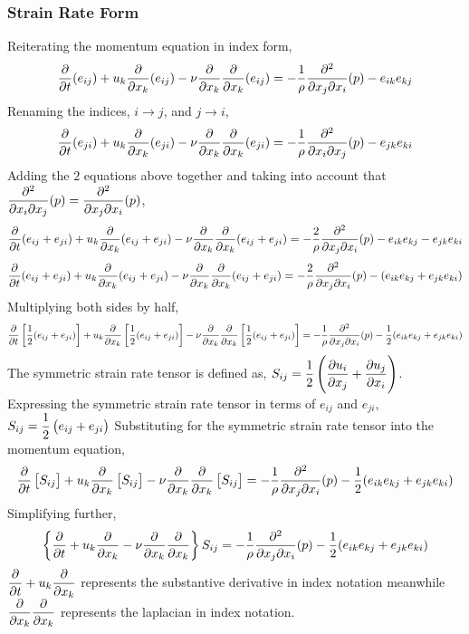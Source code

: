\documentclass[class=report, 12pt, crop=false]{standalone}
\begin{document}
\begin{center}
\subsubsection{Strain Rate Form}
\begin{comment}
\end{comment}
Reiterating the momentum equation in index form,
$$\frac{\partial}{\partial t}(e_{ij}) + u_k\frac{\partial }{\partial x_k}(e_{ij}) - \nu\frac{\partial}{\partial x_k}\frac{\partial}{\partial x_k}(e_{ij}) = -\frac{1}{\rho}\frac{\partial^2}{\partial x_j\partial x_i}(p) - e_{ik}e_{kj}$$
Renaming the indices, $i\to j$, and $j\to i$,
$$\frac{\partial}{\partial t}(e_{ji}) + u_k\frac{\partial }{\partial x_k}(e_{ji}) - \nu\frac{\partial}{\partial x_k}\frac{\partial}{\partial x_k}(e_{ji}) = -\frac{1}{\rho}\frac{\partial^2}{\partial x_i\partial x_j}(p) - e_{jk}e_{ki}$$
Adding the $2$ equations above together and taking into account that $\displaystyle{\frac{\partial^2}{\partial x_i\partial x_j}(p)=\frac{\partial^2}{\partial x_j\partial x_i}(p)}$,
$$\frac{\partial}{\partial t}(e_{ij} + e_{ji}) + u_k\frac{\partial }{\partial x_k}(e_{ij} + e_{ji}) - \nu\frac{\partial}{\partial x_k}\frac{\partial}{\partial x_k}(e_{ij} + e_{ji}) = -\frac{2}{\rho}\frac{\partial^2}{\partial x_j\partial x_i}(p) - e_{ik}e_{kj} - e_{jk}e_{ki}$$
$$\frac{\partial}{\partial t}(e_{ij} + e_{ji}) + u_k\frac{\partial }{\partial x_k}(e_{ij} + e_{ji}) - \nu\frac{\partial}{\partial x_k}\frac{\partial}{\partial x_k}(e_{ij} + e_{ji}) = -\frac{2}{\rho}\frac{\partial^2}{\partial x_j\partial x_i}(p) - (e_{ik}e_{kj} + e_{jk}e_{ki})$$
Multiplying both sides by half,
$$\frac{\partial}{\partial t}\left[\frac{1}{2}(e_{ij}+e_{ji})\right] + u_k\frac{\partial }{\partial x_k}\left[\frac{1}{2}(e_{ij}+e_{ji})\right] - \nu\frac{\partial}{\partial x_k}\frac{\partial}{\partial x_k}\left[\frac{1}{2}(e_{ij}+e_{ji})\right] = -\frac{1}{\rho}\frac{\partial^2}{\partial x_j\partial x_i}(p) - \frac{1}{2}(e_{ik}e_{kj}+e_{jk}e_{ki})$$
The symmetric strain rate tensor is defined as, $\displaystyle{S_{ij} = \frac{1}{2}\left(\frac{\partial u_i}{\partial x_j}+\frac{\partial u_j}{\partial x_i}\right)}$. Expressing the symmetric strain rate tensor in terms of $e_{ij}$ and $e_{ji}$, $\displaystyle{S_{ij} = \frac{1}{2}\left(e_{ij}+e_{ji}\right)}$
Substituting for the symmetric strain rate tensor into the momentum equation,
$$\frac{\partial}{\partial t}\left[S_{ij}\right] + u_k\frac{\partial }{\partial x_k}\left[S_{ij}\right] - \nu\frac{\partial}{\partial x_k}\frac{\partial}{\partial x_k}\left[S_{ij}\right] = -\frac{1}{\rho}\frac{\partial^2}{\partial x_j\partial x_i}(p) - \frac{1}{2}(e_{ik}e_{kj}+e_{jk}e_{ki})$$
Simplifying further,
$$\left\{\frac{\partial}{\partial t} + u_k\frac{\partial }{\partial x_k} - \nu\frac{\partial}{\partial x_k}\frac{\partial}{\partial x_k}\right\}S_{ij} = -\frac{1}{\rho}\frac{\partial^2}{\partial x_j\partial x_i}(p) - \frac{1}{2}(e_{ik}e_{kj}+e_{jk}e_{ki})$$
$\displaystyle{\frac{\partial}{\partial t} + u_k\frac{\partial}{\partial x_k}}$ represents the substantive derivative in index notation meanwhile $\displaystyle{\frac{\partial}{\partial x_k}\frac{\partial}{\partial x_k}}$ represents the laplacian in index notation.

\end{center}
\end{document}

